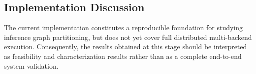 \documentclass[11pt,a4paper]{article}
\begin{document}
\subsection{Implementation Discussion}

The current implementation constitutes a reproducible foundation for studying inference graph partitioning, but does not yet cover full distributed multi-backend execution. Consequently, the results obtained at this stage should be interpreted as feasibility and characterization results rather than as a complete end-to-end system validation.
\end{document}
